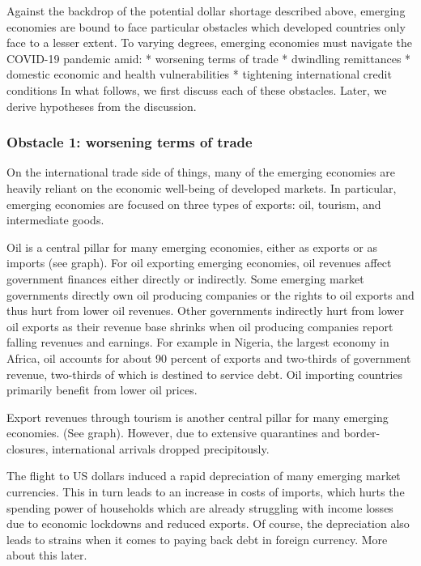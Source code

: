 \documentclass[11pt,]{article}
\begin{document}
Against the backdrop of the potential dollar shortage described above,
emerging economies are bound to face particular obstacles which
developed countries only face to a lesser extent. To varying degrees,
emerging economies must navigate the COVID-19 pandemic amid: * worsening
terms of trade * dwindling remittances * domestic economic and health
vulnerabilities * tightening international credit conditions In what
follows, we first discuss each of these obstacles. Later, we derive
hypotheses from the discussion.

\hypertarget{obstacle-1-worsening-terms-of-trade}{%
\subsubsection{Obstacle 1: worsening terms of
trade}\label{obstacle-1-worsening-terms-of-trade}}

On the international trade side of things, many of the emerging
economies are heavily reliant on the economic well-being of developed
markets. In particular, emerging economies are focused on three types of
exports: oil, tourism, and intermediate goods.

Oil is a central pillar for many emerging economies, either as exports
or as imports (see graph). For oil exporting emerging economies, oil
revenues affect government finances either directly or indirectly. Some
emerging market governments directly own oil producing companies or the
rights to oil exports and thus hurt from lower oil revenues. Other
governments indirectly hurt from lower oil exports as their revenue base
shrinks when oil producing companies report falling revenues and
earnings. For example in Nigeria, the largest economy in Africa, oil
accounts for about 90 percent of exports and two-thirds of government
revenue, two-thirds of which is destined to service debt. Oil importing
countries primarily benefit from lower oil prices.

Export revenues through tourism is another central pillar for many
emerging economies. (See graph). However, due to extensive quarantines
and border-closures, international arrivals dropped precipitously.

The flight to US dollars induced a rapid depreciation of many emerging
market currencies. This in turn leads to an increase in costs of
imports, which hurts the spending power of households which are already
struggling with income losses due to economic lockdowns and reduced
exports. Of course, the depreciation also leads to strains when it comes
to paying back debt in foreign currency. More about this later.
\end{document}
